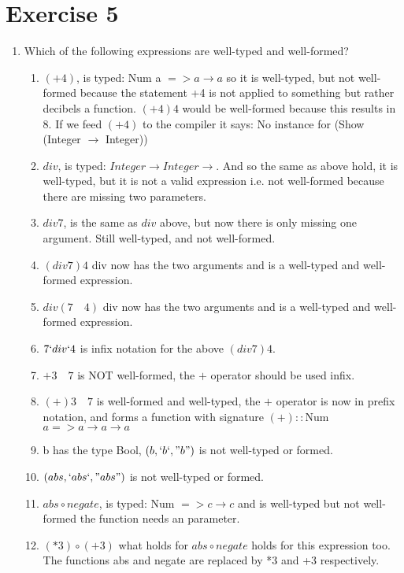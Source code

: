 \documentclass{article}
\begin{document}
\section*{Exercise 5}
\begin{enumerate}
    \item Which of the following expressions are well-typed and well-formed?
    \begin{enumerate}
        \item $(+4)$, is typed: Num a $=> a \rightarrow a$ so it is well-typed, but not well-formed because the statement +4 is not applied to something but rather decibels a function. $(+4) 4$ would be well-formed because this results in 8. If we feed $(+4)$ to the compiler it says: No instance for (Show (Integer $\rightarrow$ Integer))
        \item $div$, is typed: $Integer \rightarrow Integer \rightarrow$. And so the same as above hold, it is well-typed, but it is not a valid expression i.e. not well-formed because there are missing two parameters.
        \item $div 7$, is the same as $div$ above, but now there is only missing one argument. Still well-typed, and not well-formed.
        \item $(div 7) 4$ div now has the two arguments and is a well-typed and well-formed expression.
        \item $div (7 \quad 4)$ div now has the two arguments and is a well-typed and well-formed expression.
        \item $7 `div` 4$ is infix notation for the above $(div 7) 4$.
        \item $+ 3 \quad 7$ is NOT well-formed, the $+$ operator should be used infix.
        \item $(+) 3 \quad 7$ is well-formed and well-typed, the $+$ operator is now in prefix notation, and forms a function with signature $(+)::$Num $a => a \rightarrow a \rightarrow a$
        \item b has the type Bool, $(b, `b`, "b")$ is not well-typed or formed.
        \item $(abs, `abs`, "abs")$ is not well-typed or formed.
        \item $abs \circ negate$, is typed: Num $=> c \rightarrow c$ and is well-typed but not well-formed the function needs an parameter.
        \item $(*3) \circ (+3)$ what holds for $abs \circ negate$ holds for this expression too. The functions abs and negate are replaced by *3 and +3 respectively.

\end{enumerate}
\end{enumerate}
\end{document}
